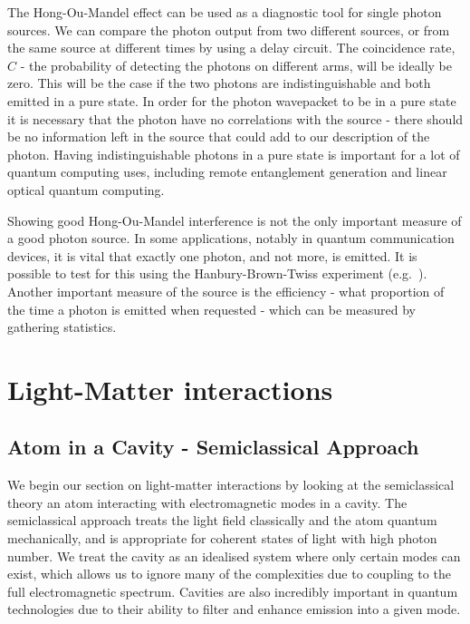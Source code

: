 The Hong-Ou-Mandel effect can be used as a diagnostic tool for single photon sources. We can compare the photon output from two different sources, or from the same source at different times by using a delay circuit. The coincidence rate, $C$ - the probability of detecting the photons on different arms, will be ideally be zero. This will be the case if the two photons are indistinguishable and both emitted in a pure state. In order for the photon wavepacket to be in a pure state it is necessary that the photon have no correlations with the source - there should be no information left in the source that could add to our description of the photon. Having indistinguishable photons in a pure state is important for a lot of quantum computing uses, including remote entanglement generation and linear optical quantum computing. 

Showing good Hong-Ou-Mandel interference is not the only important measure of a good photon source. In some applications, notably in quantum communication devices, it is vital that exactly one photon, and not more, is emitted. It is possible to test for this using the Hanbury-Brown-Twiss experiment (e.g.\ \cite{garrison+chiao}). Another important measure of the source is the efficiency - what proportion of the time a photon is emitted when requested - which can be measured by gathering statistics.


\section{Light-Matter interactions}

\subsection{Atom in a Cavity - Semiclassical Approach}

We begin our section on light-matter interactions by looking at the semiclassical theory an atom interacting with electromagnetic modes in a cavity. The semiclassical approach treats the light field classically and the atom quantum mechanically, and is appropriate for coherent states of light with high photon number. We treat the cavity as an idealised system where only certain modes can exist, which allows us to ignore many of the complexities due to coupling to the full electromagnetic spectrum. Cavities are also incredibly important in quantum technologies due to their ability to filter and enhance emission into a given mode.

